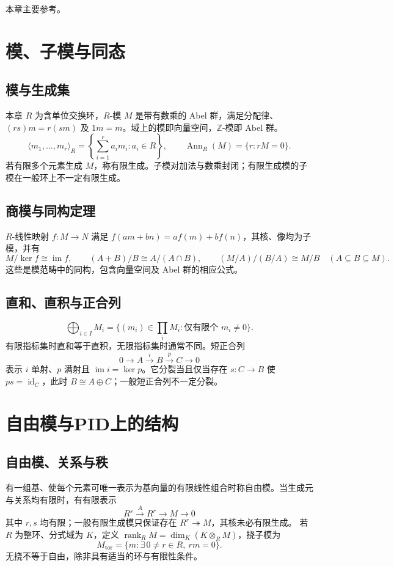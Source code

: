 \documentclass[../main.tex]{subfiles}
\begin{document}
本章主要参考\cite{milneCA,stacks}。

\section{模、子模与同态}
\subsection{模与生成集}
本章 $R$ 为含单位交换环，$R$-模 $M$ 是带有数乘的 Abel 群，满足分配律、$(rs)m=r(sm)$ 及 $1m=m$。域上的模即向量空间，$\mathbb Z$-模即 Abel 群。
\[
\langle m_1,\ldots,m_r\rangle_R=\left\{\sum_{i=1}^ra_im_i:a_i\in R\right\},\qquad
\operatorname{Ann}_R(M)=\{r:rM=0\}.
\]
若有限多个元素生成 $M$，称有限生成。子模对加法与数乘封闭；有限生成模的子模在一般环上不一定有限生成。
\subsection{商模与同构定理}
$R$-线性映射 $f:M\to N$ 满足 $f(am+bn)=af(m)+bf(n)$，其核、像均为子模，并有
\[
M/\ker f\cong\operatorname{im}f,\qquad
(A+B)/B\cong A/(A\cap B),\qquad
(M/A)/(B/A)\cong M/B\quad(A\subseteq B\subseteq M).
\]
这些是模范畴中的同构，包含向量空间及 Abel 群的相应公式。
\subsection{直和、直积与正合列}
\[
\bigoplus_{i\in I}M_i=\{(m_i)\in\prod_iM_i:\text{仅有限个 }m_i\ne0\}.
\]
有限指标集时直和等于直积，无限指标集时通常不同。短正合列
\[
0\to A\xrightarrow{i}B\xrightarrow{p}C\to0
\]
表示 $i$ 单射、$p$ 满射且 $\operatorname{im}i=\ker p$。它分裂当且仅当存在 $s:C\to B$ 使 $ps=\operatorname{id}_C$，此时 $B\cong A\oplus C$；一般短正合列不一定分裂。
\section{自由模与PID上的结构}
\subsection{自由模、关系与秩}
有一组基、使每个元素可唯一表示为基向量的有限线性组合时称自由模。当生成元与关系均有限时，有有限表示
\[
R^s\xrightarrow{A}R^r\to M\to0
\]
其中 $r,s$ 均有限；一般有限生成模只保证存在 $R^r\twoheadrightarrow M$，其核未必有限生成。
若 $R$ 为整环、分式域为 $K$，定义 $\operatorname{rank}_R M=\dim_K(K\otimes_RM)$，挠子模为
\[
M_{\mathrm{tor}}=\{m:\exists\,0\ne r\in R,\ rm=0\}.
\]
无挠不等于自由，除非具有适当的环与有限性条件。
\end{document}
